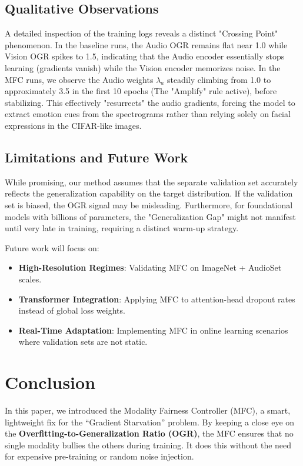 \documentclass[10pt, twocolumn, letterpaper]{article}
\begin{document}
\subsection{Qualitative Observations}
A detailed inspection of the training logs reveals a distinct "Crossing Point" phenomenon. In the baseline runs, the Audio OGR remains flat near 1.0 while Vision OGR spikes to 1.5, indicating that the Audio encoder essentially stops learning (gradients vanish) while the Vision encoder memorizes noise. In the MFC runs, we observe the Audio weights $\lambda_a$ steadily climbing from 1.0 to approximately 3.5 in the first 10 epochs (The "Amplify" rule active), before stabilizing. This effectively "resurrects" the audio gradients, forcing the model to extract emotion cues from the spectrograms rather than relying solely on facial expressions in the CIFAR-like images.

\subsection{Limitations and Future Work}
While promising, our method assumes that the separate validation set accurately reflects the generalization capability on the target distribution. If the validation set is biased, the OGR signal may be misleading. Furthermore, for foundational models with billions of parameters, the "Generalization Gap" might not manifest until very late in training, requiring a distinct warm-up strategy.

Future work will focus on:
\begin{itemize}
    \item \textbf{High-Resolution Regimes}: Validating MFC on ImageNet + AudioSet \cite{audioset} scales.
    \item \textbf{Transformer Integration}: Applying MFC to attention-head dropout rates instead of global loss weights.
    \item \textbf{Real-Time Adaptation}: Implementing MFC in online learning scenarios where validation sets are not static.
\end{itemize}

\section{Conclusion}
In this paper, we introduced the Modality Fairness Controller (MFC), a smart, lightweight fix for the ``Gradient Starvation'' problem. By keeping a close eye on the \textbf{Overfitting-to-Generalization Ratio (OGR)}, the MFC ensures that no single modality bullies the others during training. It does this without the need for expensive pre-training or random noise injection.
\end{document}

